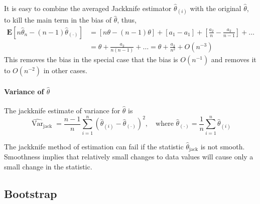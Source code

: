 \begin{remark}
    It is easy to combine the averaged Jackknife estimator $\hat{\theta}_{(i)}$ with the original $\hat{\theta}$, to kill the main term in the bias of $\hat{\theta}$, thus,
    \begin{equation}
        \begin{aligned}
            \mathbf{E}\left[n\hat{\theta}_{n}-(n-1)\hat{\theta}_{(\mathbf{\cdot})}\right] & =\left[n\theta-(n-1)\theta\right]+\left[a_{1}-a_{1}\right]+\left[\frac{a_{2}}{n}-\frac{a_{2}}{n-1}\right]+\ldots \\
                                                                                          & =\theta+\frac{a_{2}}{n(n-1)}+\ldots=\theta+\frac{a_{2}}{n^{2}}+O\left(n^{-3}\right)
        \end{aligned}
    \end{equation}
    This removes the bias in the special case that the bias is $O\left(n^{-1}\right)$ and removes it to $O\left(n^{-2}\right)$ in other cases.
\end{remark}

\paragraph{Variance of $\hat{\theta}$}

The jackknife estimate of variance for $\hat{\theta}$ is
\begin{equation}
    \widehat{\operatorname{Var}}_{\text{jack}}=\frac{n-1}{n}\sum_{i=1}^{n}\left(\hat{\theta}_{(i)}-\hat{\theta}_{(\cdot)}\right)^{2},\quad\text{where }\hat{\theta}_{(\cdot)}=\frac{1}{n}\sum_{i=1}^{n}\hat{\theta}_{(i)}
\end{equation}

The jackknife method of estimation can fail if the statistic $\hat{\theta}_{\text{jack}}$ is not smooth. Smoothness
implies that relatively small changes to data values will cause only a small change in the
statistic.

\begin{example}

\end{example}

\begin{example}

\end{example}

\subsection{Bootstrap}

